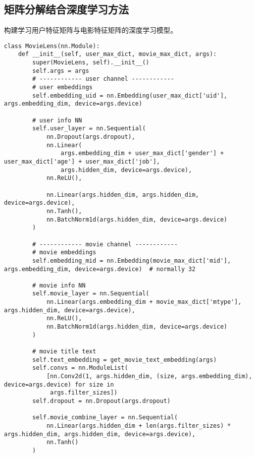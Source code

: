 \begin{spacing}{1.5}
\subsection{矩阵分解结合深度学习方法}
\par
构建学习用户特征矩阵与电影特征矩阵的深度学习模型。
\begin{lstlisting}
class MovieLens(nn.Module):
    def __init__(self, user_max_dict, movie_max_dict, args):
        super(MovieLens, self).__init__()
        self.args = args
        # ------------ user channel ------------
        # user embeddings
        self.embedding_uid = nn.Embedding(user_max_dict['uid'], args.embedding_dim, device=args.device)
        
        # user info NN
        self.user_layer = nn.Sequential(
            nn.Dropout(args.dropout),
            nn.Linear(
                args.embedding_dim + user_max_dict['gender'] + user_max_dict['age'] + user_max_dict['job'],
                args.hidden_dim, device=args.device),
            nn.ReLU(),
            
            nn.Linear(args.hidden_dim, args.hidden_dim, device=args.device),
            nn.Tanh(),
            nn.BatchNorm1d(args.hidden_dim, device=args.device)
        )
        
        # ------------ movie channel ------------
        # movie embeddings
        self.embedding_mid = nn.Embedding(movie_max_dict['mid'], args.embedding_dim, device=args.device)  # normally 32
        
        # movie info NN
        self.movie_layer = nn.Sequential(
            nn.Linear(args.embedding_dim + movie_max_dict['mtype'], args.hidden_dim, device=args.device),
            nn.ReLU(),
            nn.BatchNorm1d(args.hidden_dim, device=args.device)
        )
        
        # movie title text
        self.text_embedding = get_movie_text_embedding(args)
        self.convs = nn.ModuleList(
            [nn.Conv2d(1, args.hidden_dim, (size, args.embedding_dim), device=args.device) for size in
             args.filter_sizes])
        self.dropout = nn.Dropout(args.dropout)
        
        self.movie_combine_layer = nn.Sequential(
            nn.Linear(args.hidden_dim + len(args.filter_sizes) * args.hidden_dim, args.hidden_dim, device=args.device),
            nn.Tanh()
        )
    

\end{lstlisting}
\end{spacing}
